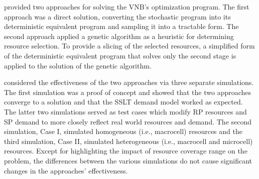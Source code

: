 \documentclass[12pt,dvipsnames]{report}
\begin{document}
 provided two approaches for solving the VNB's optimization program.  The first approach was a direct solution, converting the stochastic program into its deterministic equivalent program and sampling it into a tractable form.  The second approach applied a genetic algorithm as a heuristic for determining resource selection.  To provide a slicing of the selected resources, a simplified form of the deterministic equivalent program that solves only the second stage is applied to the solution of the genetic algorithm. 

 considered the effectiveness of the two approaches via three separate simulations.  The first simulation was a proof of concept and showed that the two approaches converge to a solution and that the SSLT demand model worked as expected.  The latter two simulations served as test cases which modify RP resources and SP demand to more closely reflect real world resources and demand.  The second simulation, Case I, simulated homogeneous (i.e., macrocell) resources and the third simulation, Case II, simulated heterogeneous (i.e., macrocell and microcell) resources.  Except for highlighting the impact of resource coverage range on the problem, the differences between the various simulations do not cause significant changes in the approaches' effectiveness.
\end{document}

